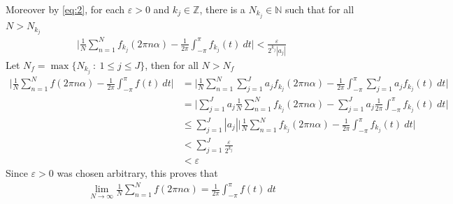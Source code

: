 \documentclass[12pt]{exam}
\theoremstyle{plain} %
\theoremstyle{definition} %
\theoremstyle{remark} %
\begin{document}
\begin{questions}
\begin{solution}
    Moreover by \autoref{eq:2}, for each $\varepsilon > 0$ and $k_j \in
    \mathbb{Z}$, there is
    a $N_{k_j} \in \mathbb{N}$ such that for all $N > N_{k_j}$
    \begin{align*}
      \Bigg| \frac{1}{N} \sum_{n = 1}^{N} f_{k_j}(2\pi n \alpha) -
      \frac{1}{2\pi} \int_{-\pi}^{\pi}  f_{k_j}(t) \ dt\Bigg| <
      \frac{\varepsilon}{2^{k_j}|a_j|}
    \end{align*}
    Let $N_f = \max \{ N_{k_j}  \ : \  1 \le j \le J \}$, then for all $N > N_f$
    \begin{align*}
      \Bigg|\frac{1}{N} \sum_{n = 1}^{N} f(2\pi n \alpha) -
      \frac{1}{2\pi} \int_{-\pi}^{\pi}  f(t) \ dt\Bigg| &=
      \Bigg|\frac{1}{N}\sum_{n = 1}^{N} \sum_{j = 1}^{J} a_j
      f_{k_j}(2 \pi n \alpha) - \frac{1}{2\pi}
      \int_{-\pi}^{ \pi}  \sum_{j = 1}^{J} a_j f_{k_j}(t) \ dt \Bigg| \\
      &= \Bigg|\sum_{j = 1}^{J} a_j \frac{1}{N}\sum_{n = 1}^{N}
      f_{k_j}(2 \pi n \alpha) - \sum_{j = 1}^{J} a_j  \frac{1}{2\pi}
      \int_{-\pi}^{ \pi}  f_{k_j}(t) \ dt \Bigg| \\
      &\le \sum_{j = 1}^{J} |a_j| \Bigg|\frac{1}{N}\sum_{n = 1}^{N}
      f_{k_j}(2 \pi n \alpha) -  \frac{1}{2\pi}
      \int_{-\pi}^{ \pi}   f_{k_j}(t) \ dt\Bigg| \\
      &< \sum_{j = 1}^{J} \frac{\varepsilon}{2^{k_j}} \\
      &< \varepsilon
    \end{align*}
    Since $\varepsilon > 0$ was chosen arbitrary, this proves that
    \begin{align*}
      \lim_{N \to \infty} \frac{1}{N} \sum_{n = 1}^{N} f(2 \pi n
      \alpha) = \frac{1}{2\pi}
      \int_{- \pi}^{ \pi}  f(t) \ dt
    \end{align*}
  \end{solution}


\end{questions}
\end{document}
